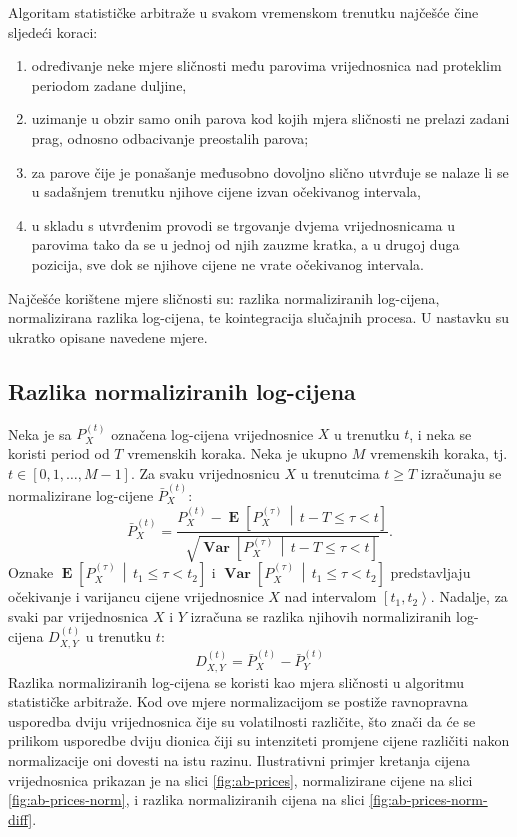 \documentclass[lmodern, utf8, diplomski, numeric]{fer}
\newcommand{\Efromto}[2]{\operatorname{\mathbf{E}}\q[#1\, \middle\vert\, #2\w]}
\newcommand{\Varfromto}[2]{\operatorname{\mathbf{Var}}\q[#1\, \middle\vert\, #2\w]}
\newcommand{\norm}[1]{\bar{#1}}
\newcommand{\q}{\left}
\newcommand{\w}{\right}
\begin{document}
  Algoritam statističke arbitraže u svakom vremenskom trenutku najčešće čine sljedeći koraci:
  \begin{enumerate}
    \item određivanje neke mjere sličnosti među parovima vrijednosnica nad proteklim periodom zadane duljine,
    \item uzimanje u obzir samo onih parova kod kojih mjera sličnosti ne prelazi zadani prag, odnosno odbacivanje preostalih parova;
    \item za parove čije je ponašanje međusobno dovoljno slično utvrđuje se nalaze li se u sadašnjem trenutku njihove cijene izvan očekivanog intervala,
    \item u skladu s utvrđenim provodi se trgovanje dvjema vrijednosnicama u parovima tako da se u jednoj od njih zauzme kratka, a u drugoj duga pozicija, sve dok se njihove cijene ne vrate očekivanog intervala.
  \end{enumerate}
  
  Najčešće korištene mjere sličnosti su: razlika normaliziranih log-cijena, normalizirana razlika log-cijena, te kointegracija slučajnih procesa.
  U nastavku su ukratko opisane navedene mjere.
  
  \subsection{Razlika normaliziranih log-cijena}
  Neka je sa $P_X^{\q(t\w)}$ označena log-cijena vrijednosnice $X$ u trenutku $t$, i neka se koristi period od $T$ vremenskih koraka.
  Neka je ukupno $M$ vremenskih koraka, tj. $t \in \q[0, 1, \ldots, M - 1\w]$.
  Za svaku vrijednosnicu $X$ u trenutcima $t \ge T$ izračunaju se normalizirane log-cijene $\norm{P}_X^{\q(t\w)}$:
  \begin{equation}
  \norm{P}_X^{\q(t\w)} = \frac{P_X^{\q(t\w)} - \Efromto{P_X^{(\tau)}}{t-T \le \tau < t}}{\sqrt{\Varfromto{P_X^{(\tau)}}{t-T \le \tau < t}}}.
  \end{equation}
  Oznake $\Efromto{P_X^{(\tau)}}{t_1 \le \tau < t_2}$ i $\Varfromto{P_X^{(\tau)}}{t_1 \le \tau < t_2}$ predstavljaju očekivanje i varijancu cijene vrijednosnice $X$ nad intervalom $\q[t_1, t_2\w\rangle$.
  Nadalje, za svaki par vrijednosnica $X$ i $Y$ izračuna se razlika njihovih normaliziranih log-cijena $D_{X,Y}^{\q(t\w)}$ u trenutku $t$:
  \begin{equation}
  D_{X,Y}^{\q(t\w)} = \norm{P}_X^{\q(t\w)} - \norm{P}_Y^{\q(t\w)}
  \end{equation}
  Razlika normaliziranih log-cijena se koristi kao mjera sličnosti u algoritmu statističke arbitraže.
  Kod ove mjere normalizacijom se postiže ravnopravna usporedba dviju vrijednosnica čije su volatilnosti različite, što znači da će se prilikom usporedbe dviju dionica čiji su intenziteti promjene cijene različiti nakon normalizacije oni dovesti na istu razinu.
  Ilustrativni primjer kretanja cijena vrijednosnica prikazan je na slici \ref{fig:ab-prices}, normalizirane cijene na slici \ref{fig:ab-prices-norm}, i razlika normaliziranih cijena na slici \ref{fig:ab-prices-norm-diff}.
  
\end{document}

